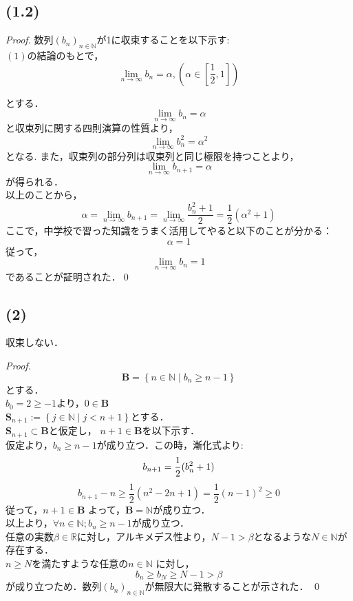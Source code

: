 \documentclass{jarticle}
\begin{document}
\subsection*{(1.2)}
\begin{proof}
数列$(b_{n})_{n\in \mathbb{N}}$が1に収束することを以下示す:\\
$(1)$の結論のもとで，
$$ 
\lim_{n \to \infty} b_{n} = \alpha , (\alpha \in [\frac{1}{2} , 1])
$$ 

とする．\\
$$
\lim_{n \to \infty} b_{n} = \alpha
$$
と収束列に関する四則演算の性質より，\\
$$
\lim_{n \to \infty} b_{n}^{2} = \alpha^{2}
$$
となる.
また，収束列の部分列は収束列と同じ極限を持つことより，
$$
\lim_{n \to \infty} b_{n+1} = \alpha
$$
が得られる．\\
以上のことから，\\
$$
 \alpha = \lim_{n \to \infty} b_{n+1} = \lim_{n \to \infty} \frac{b_{n}^{2}+1}{2} =\frac{1}{2} (\alpha^{2} +1)
$$
ここで，中学校で習った知識をうまく活用してやると以下のことが分かる：\\
$$
 \alpha =1
$$
従って，
$$
\lim_{n \to \infty }b_{n} = 1
$$
 であることが証明された．\qed
 \end{proof}
\subsection*{(2)}
\noindent 収束しない．\\
\begin{proof}
$$
\mathbf{B} = \left\{ n \in \mathbb{N} \mid b_{n} \ge n-1 \right\}
$$
とする．\\
$b_0 =2 \ge -1$より，$ 0 \in \mathbf{B}$ \\
$ \mathbf{S}_{n+1} := \left\{j \in \mathbb{N} \mid j < n+1 \right\}$とする． \\
$ \mathbf{S}_{n+1} \subset \mathbf{B} $と仮定し， $n+1 \in \mathbf{B} $を以下示す．\\
仮定より，$b_n \ge n-1$が成り立つ．この時，漸化式より:\\
$$
b_{n+1} = \frac{1}{2} ( b_n^2 +1 ) \\
$$
$$
b_{n+1} -n \ge \frac{1}{2} (n^2 -2n +1) = \frac{1}{2}(n-1)^2 \ge 0
$$
従って，$ n+1 \in \mathbf{B} $ よって，$ \mathbf{B} = \mathbb{N}$が成り立つ．\\
以上より，$ \forall  n \in \mathbb{N} ; b_n \ge n-1 $が成り立つ．\\
任意の実数$ \beta \in \mathbb{R} $に対し，アルキメデス性より，$ N-1 > \beta $となるような$ N \in \mathbb{N}$が存在する．\\
$n \ge N$を満たすような任意の$n \in \mathbb{N}$ に対し，\\
$$
b_n \ge b_N \ge N-1 > \beta
$$
が成り立つため．数列$(b_{n})_{n\in \mathbb{N}}$が無限大に発散することが示された．
\qed
\end{proof}
\end{document}
